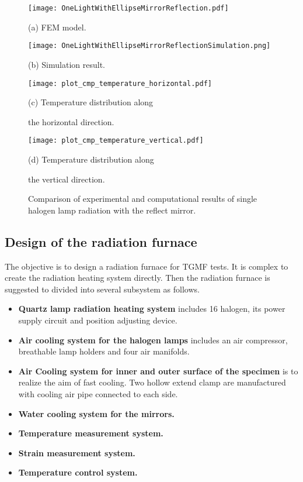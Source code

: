 \begin{figure}
  \begin{minipage}[t]{0.5\linewidth} %
  \nonumber
    \centering
    \texttt{[image: OneLightWithEllipseMirrorReflection.pdf]}
    \centerline{(a) FEM model.}
  \end{minipage}%
  \begin{minipage}[t]{0.5\linewidth}
    \centering
    \texttt{[image: OneLightWithEllipseMirrorReflectionSimulation.png]}
    \centerline{(b) Simulation result.}
  \end{minipage}

  \begin{minipage}[t]{0.5\linewidth} %
  \nonumber
    \centering
    \texttt{[image: plot\_cmp\_temperature\_horizontal.pdf]}
    \centerline{(c) Temperature distribution along }
    \centerline{the horizontal direction. }
  \end{minipage}%
  \begin{minipage}[t]{0.5\linewidth}
    \centering
    \texttt{[image: plot\_cmp\_temperature\_vertical.pdf]}
    \centerline{(d) Temperature distribution along }
    \centerline{the vertical direction. }
  \end{minipage}

  \caption{Comparison of experimental and computational results of single halogen lamp radiation with the reflect mirror.}
  \label{Fig:OneLightWithReflection}
\end{figure}
\newpage
\subsection{Design of the radiation furnace}
The objective is to design a radiation furnace for TGMF tests.
It is complex to create the radiation heating system directly.
Then the radiation furnace is suggested to divided into several subsystem as follows.
\begin{itemize}
\item \textbf{Quartz lamp radiation heating system} includes 16 halogen, its power supply circuit and position adjusting device.
\item \textbf{Air cooling system for the halogen lamps} includes an air compressor, breathable lamp holders and four air manifolds.
\item \textbf{Air Cooling system for inner and outer surface of the specimen } is to realize the aim of fast cooling. Two hollow extend clamp are manufactured with cooling air pipe connected to each side.

\item \textbf{Water cooling system for the mirrors.}
\item \textbf{Temperature measurement system.}
\item \textbf{Strain measurement system.}
\item \textbf{Temperature control system.}
\end{itemize}


